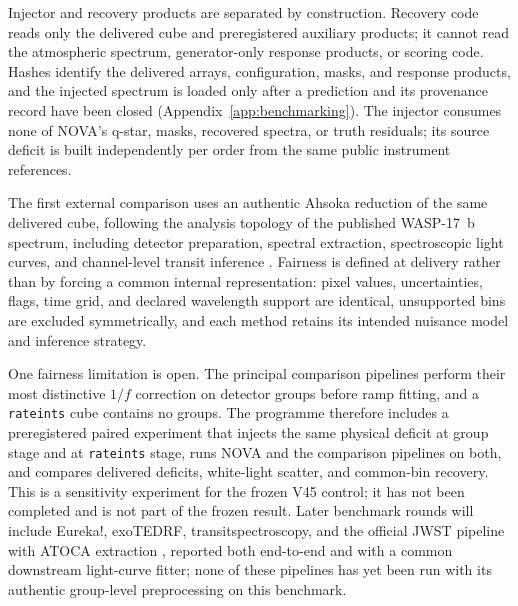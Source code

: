 
Injector and recovery products are separated by construction. Recovery code
reads only the delivered cube and preregistered auxiliary products; it
cannot read the atmospheric spectrum, generator-only response products, or
scoring code. Hashes identify the delivered arrays, configuration, masks,
and response products, and the injected spectrum is loaded only after a
prediction and its provenance record have been closed
(Appendix~\ref{app:benchmarking}). The injector consumes none of NOVA's
q-star, masks, recovered spectra, or truth residuals; its source deficit is
built independently per order from the same public instrument references.

The first external comparison uses an authentic Ahsoka reduction of the same
delivered cube, following the analysis topology of the published WASP-17~b
spectrum, including detector preparation, spectral extraction, spectroscopic
light curves, and channel-level transit inference \citep{LouieEtAl2025}.
Fairness is defined at delivery rather than by forcing a common internal
representation: pixel values, uncertainties, flags, time grid, and declared
wavelength support are identical, unsupported bins are excluded
symmetrically, and each method retains its intended nuisance model and
inference strategy.

One fairness limitation is open. The principal comparison pipelines perform
their most distinctive $1/f$ correction on detector groups before ramp
fitting, and a \texttt{rateints} cube contains no groups. The programme
therefore includes a preregistered paired experiment that injects the same
physical deficit at group stage and at \texttt{rateints} stage, runs NOVA
and the comparison pipelines on both, and compares delivered deficits,
white-light scatter, and common-bin recovery. This is a sensitivity
experiment for the frozen V45 control; it has not been completed and is not
part of the frozen result. Later benchmark rounds will include Eureka!,
exoTEDRF, transitspectroscopy, and the official JWST pipeline with ATOCA
extraction
\citep{BellEtAl2022,Radica2024,DarveauBernierEtAl2022,LouieEtAl2025},
reported both end-to-end and with a common downstream light-curve fitter;
none of these pipelines has yet been run with its authentic group-level
preprocessing on this benchmark.

